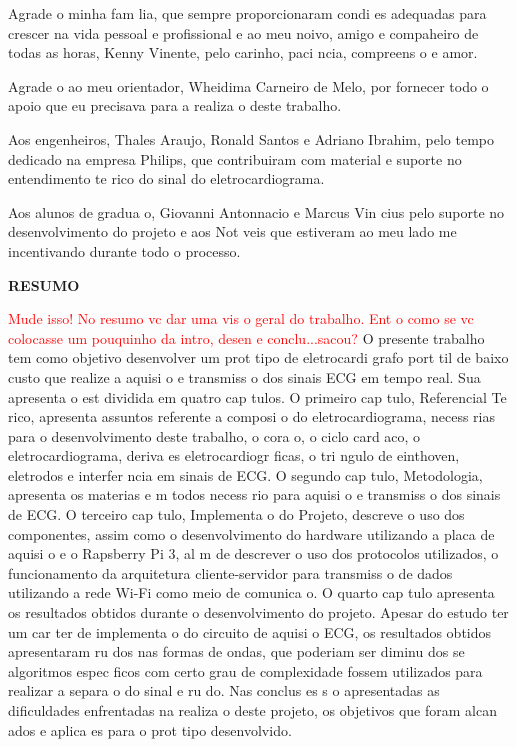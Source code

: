 \documentclass{article}
\begin{document}
\hspace*{0.8cm} Agrade o   minha fam lia, que sempre proporcionaram condi es adequadas para crescer na vida pessoal e profissional e ao meu noivo, amigo e compaheiro de todas as horas, Kenny Vinente, pelo carinho, paci ncia, compreens o e amor.

\hspace*{0.8cm} Agrade o ao meu orientador, Wheidima Carneiro de Melo, por fornecer todo o apoio que eu precisava para a realiza o deste trabalho.


\hspace*{0.8cm}Aos engenheiros, Thales Araujo, Ronald Santos e Adriano Ibrahim, pelo tempo dedicado na empresa Philips, que contribuiram com material e suporte no entendimento te rico do sinal do eletrocardiograma.


\hspace*{0.8cm}Aos alunos de gradua o, Giovanni Antonnacio e Marcus Vin cius pelo suporte no desenvolvimento do projeto e aos Not veis que estiveram ao meu lado me incentivando durante todo o processo.




\newpage


\thispagestyle{empty}
\vspace*{4.4cm}
{\begin{center}\textbf{\normalsize RESUMO}\vspace{36pt}\end{center}}
\textcolor{red}{Mude isso! No resumo vc dar  uma vis o geral do trabalho. Ent o   como se vc colocasse um pouquinho da intro, desen e conclu...sacou?}
O presente trabalho tem como objetivo desenvolver um prot tipo de eletrocardi grafo port til de baixo custo que realize a aquisi o e transmiss o dos sinais ECG em tempo real. Sua apresenta o est  dividida em quatro cap tulos. O primeiro cap tulo, Referencial Te rico, apresenta assuntos referente a composi o do eletrocardiograma, necess rias para o desenvolvimento deste trabalho, o cora o, o ciclo card aco, o eletrocardiograma, deriva es eletrocardiogr ficas, o tri ngulo de einthoven, eletrodos e interfer ncia em sinais de ECG. O segundo cap tulo, Metodologia, apresenta os materias e m todos necess rio para aquisi o e transmiss o dos sinais de ECG. O terceiro cap tulo, Implementa o do Projeto, descreve o uso dos componentes, assim como o desenvolvimento do hardware utilizando a placa de aquisi o e o Rapsberry Pi 3, al m de descrever o uso dos protocolos utilizados, o funcionamento da arquitetura cliente-servidor para transmiss o de dados utilizando a rede Wi-Fi como meio de comunica o. O quarto cap tulo apresenta os resultados obtidos durante o desenvolvimento do projeto. Apesar do estudo ter um car ter de implementa o do circuito de aquisi o ECG, os resultados obtidos apresentaram ru dos nas formas de ondas, que poderiam ser diminu dos se algoritmos espec ficos com certo grau de complexidade fossem utilizados para realizar a separa o do sinal e ru do. Nas conclus es s o apresentadas as dificuldades enfrentadas na realiza o deste projeto, os objetivos que foram alcan ados e aplica es para o prot tipo desenvolvido.
\end{document}
